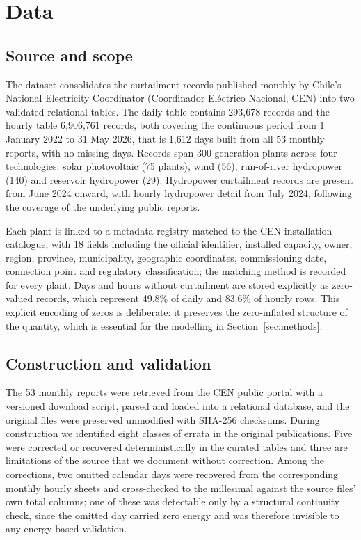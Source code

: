\documentclass[preprint,3p,times]{elsarticle}
\begin{document}
\section{Data}
\label{sec:data}

\subsection{Source and scope}

The dataset consolidates the curtailment records published monthly by Chile's National Electricity Coordinator (Coordinador El\'ectrico Nacional, CEN) into two validated relational tables. The daily table contains 293{,}678 records and the hourly table 6{,}906{,}761 records, both covering the continuous period from 1 January 2022 to 31 May 2026, that is 1{,}612 days built from all 53 monthly reports, with no missing days. Records span 300 generation plants across four technologies: solar photovoltaic (75 plants), wind (56), run-of-river hydropower (140) and reservoir hydropower (29). Hydropower curtailment records are present from June 2024 onward, with hourly hydropower detail from July 2024, following the coverage of the underlying public reports.

Each plant is linked to a metadata registry matched to the CEN installation catalogue, with 18 fields including the official identifier, installed capacity, owner, region, province, municipality, geographic coordinates, commissioning date, connection point and regulatory classification; the matching method is recorded for every plant. Days and hours without curtailment are stored explicitly as zero-valued records, which represent 49.8\% of daily and 83.6\% of hourly rows. This explicit encoding of zeros is deliberate: it preserves the zero-inflated structure of the quantity, which is essential for the modelling in Section~\ref{sec:methods}.

\subsection{Construction and validation}

The 53 monthly reports were retrieved from the CEN public portal with a versioned download script, parsed and loaded into a relational database, and the original files were preserved unmodified with SHA-256 checksums. During construction we identified eight classes of errata in the original publications. Five were corrected or recovered deterministically in the curated tables and three are limitations of the source that we document without correction. Among the corrections, two omitted calendar days were recovered from the corresponding monthly hourly sheets and cross-checked to the millesimal against the source files' own total columns; one of these was detectable only by a structural continuity check, since the omitted day carried zero energy and was therefore invisible to any energy-based validation.
\end{document}
